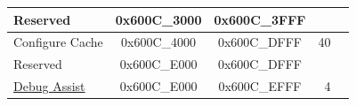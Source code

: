 \begin{longtable}[c]{ |p{5cm}|c|c|r|p{1.0cm}| }
    \rowcolor{gray!25}  Reserved                    & 0x600C\_3000 & 0x600C\_3FFF &        &   \\\hline
                        Configure Cache         & 0x600C\_4000 & 0x600C\_DFFF &  40    &   \\\hline
    \rowcolor{gray!25}  Reserved                    & 0x600C\_E000 & 0x600C\_DFFF &        &   \\\hline
                        \hyperref[mod:dbgassist]{Debug Assist}                & 0x600C\_E000 & 0x600C\_EFFF &   4    &   \\\hline

\end{longtable}
